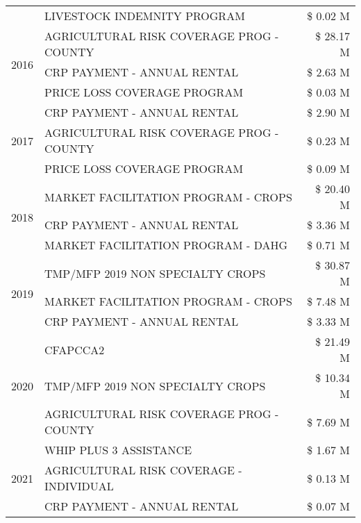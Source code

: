 \begin{tabular}{llr}
 & LIVESTOCK INDEMNITY PROGRAM & \$ 0.02 M \\
\cline{1-3}
\multirow[t]{3}{*}{2016} & AGRICULTURAL RISK COVERAGE PROG - COUNTY      & \$ 28.17 M \\
 & CRP PAYMENT - ANNUAL RENTAL                   & \$ 2.63 M \\
 & PRICE LOSS COVERAGE PROGRAM                   & \$ 0.03 M \\
\cline{1-3}
\multirow[t]{3}{*}{2017} & CRP PAYMENT - ANNUAL RENTAL & \$ 2.90 M \\
 & AGRICULTURAL RISK COVERAGE PROG - COUNTY & \$ 0.23 M \\
 & PRICE LOSS COVERAGE PROGRAM & \$ 0.09 M \\
\cline{1-3}
\multirow[t]{3}{*}{2018} & MARKET FACILITATION PROGRAM - CROPS & \$ 20.40 M \\
 & CRP PAYMENT - ANNUAL RENTAL & \$ 3.36 M \\
 & MARKET FACILITATION PROGRAM - DAHG & \$ 0.71 M \\
\cline{1-3}
\multirow[t]{3}{*}{2019} & TMP/MFP 2019 NON SPECIALTY CROPS & \$ 30.87 M \\
 & MARKET FACILITATION PROGRAM - CROPS & \$ 7.48 M \\
 & CRP PAYMENT - ANNUAL RENTAL & \$ 3.33 M \\
\cline{1-3}
\multirow[t]{3}{*}{2020} & CFAPCCA2 & \$ 21.49 M \\
 & TMP/MFP 2019 NON SPECIALTY CROPS & \$ 10.34 M \\
 & AGRICULTURAL RISK COVERAGE PROG - COUNTY & \$ 7.69 M \\
\cline{1-3}
\multirow[t]{3}{*}{2021} & WHIP PLUS 3 ASSISTANCE & \$ 1.67 M \\
 & AGRICULTURAL RISK COVERAGE - INDIVIDUAL & \$ 0.13 M \\
 & CRP PAYMENT - ANNUAL RENTAL & \$ 0.07 M \\
\cline{1-3}
\bottomrule
\end{tabular}
